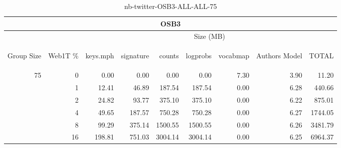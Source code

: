 \begin{center}
\begin{table}[htbp] 
 \begin{center}
\begin{tabular}{ | r | r | r | r | r | r | r | r | r |}
\hline
\multicolumn{9}{|c|}{OSB3}\\
\hline
 & & \multicolumn{7}{|c|}{Size (MB)}\\ \cline{3-9}
\begin{sideways}Group Size\end{sideways} & \begin{sideways}Web1T \% \end{sideways} & \begin{sideways}keys.mph\end{sideways} & \begin{sideways}signature\end{sideways} & \begin{sideways}counts\end{sideways} & \begin{sideways}logprobs\end{sideways} & \begin{sideways}vocabmap\end{sideways} & \begin{sideways}Authors Model \end{sideways} & \begin{sideways}TOTAL\end{sideways}\\
\hline
\multirow{5}{*}{75}
 & 0 & 0.00 & 0.00 & 0.00 & 0.00 & 7.30 & 3.90 & 11.20\\ \cline{2-9}
 & 1 & 12.41 & 46.89 & 187.54 & 187.54 & 0.00 & 6.28 & 440.66\\ \cline{2-9}
 & 2 & 24.82 & 93.77 & 375.10 & 375.10 & 0.00 & 6.22 & 875.01\\ \cline{2-9}
 & 4 & 49.65 & 187.57 & 750.28 & 750.28 & 0.00 & 6.27 & 1744.05\\ \cline{2-9}
 & 8 & 99.29 & 375.14 & 1500.55 & 1500.55 & 0.00 & 6.26 & 3481.79\\ \cline{2-9}
 & 16 & 198.81 & 751.03 & 3004.14 & 3004.14 & 0.00 & 6.25 & 6964.37\\ \cline{2-9}
\hline
\end{tabular}
\caption{nb-twitter-OSB3-ALL-ALL-75}
\label{table:nb-twitter-OSB3-ALL-ALL-75}
\end{center}
 \end{table}
\end{center}

